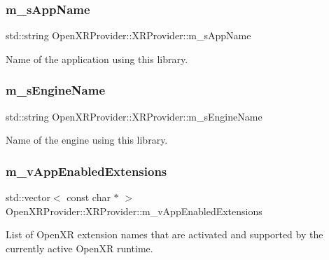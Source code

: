 \subsubsection{\texorpdfstring{m\_sAppName}{m\_sAppName}}
{\footnotesize\ttfamily std\+::string Open\+X\+R\+Provider\+::\+X\+R\+Provider\+::m\+\_\+s\+App\+Name\hspace{0.3cm}{\ttfamily [private]}}



Name of the application using this library. 

\mbox{\label{class_open_x_r_provider_1_1_x_r_provider_afaa7e0d87fcb7349324328b07a96f8e8}} 
\subsubsection{\texorpdfstring{m\_sEngineName}{m\_sEngineName}}
{\footnotesize\ttfamily std\+::string Open\+X\+R\+Provider\+::\+X\+R\+Provider\+::m\+\_\+s\+Engine\+Name\hspace{0.3cm}{\ttfamily [private]}}



Name of the engine using this library. 

\mbox{\label{class_open_x_r_provider_1_1_x_r_provider_a4d49ff8b8fbf41abcddadb833dc07008}} 
\subsubsection{\texorpdfstring{m\_vAppEnabledExtensions}{m\_vAppEnabledExtensions}}
{\footnotesize\ttfamily std\+::vector$<$ const char $\ast$ $>$ Open\+X\+R\+Provider\+::\+X\+R\+Provider\+::m\+\_\+v\+App\+Enabled\+Extensions\hspace{0.3cm}{\ttfamily [private]}}



List of Open\+XR extension names that are activated and supported by the currently active Open\+XR runtime. 

